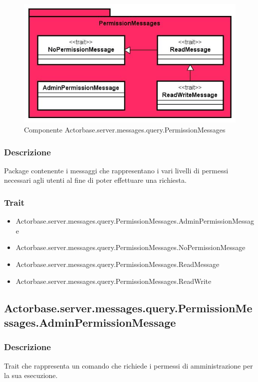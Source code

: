 \documentclass[a4paper]{article}
\begin{document}
			\begin{figure}[H]
				\centering
				\includegraphics[width=\textwidth]{ST/Server/permissionMessagesLevel}
				\caption{Componente Actorbase.server.messages.query.PermissionMessages}
			\end{figure}
			
			\subsubsection{Descrizione}
				Package contenente i messaggi che rappresentano i vari livelli di permessi necessari agli utenti al fine di poter 
				effettuare una richiesta.
				
			\subsubsection{Trait}
				\begin{itemize}
					\item Actorbase.server.messages.query.PermissionMessages.AdminPermissionMessage
					\item Actorbase.server.messages.query.PermissionMessages.NoPermissionMessage
					\item Actorbase.server.messages.query.PermissionMessages.ReadMessage
					\item Actorbase.server.messages.query.PermissionMessages.ReadWrite
				\end{itemize}
				
		\subsection{Actorbase.server.messages.query.PermissionMessages.AdminPermissionMessage}
			\subsubsection{Descrizione}
				Trait che rappresenta un comando che richiede i permessi di amministrazione per la sua esecuzione.
				
\end{document}
